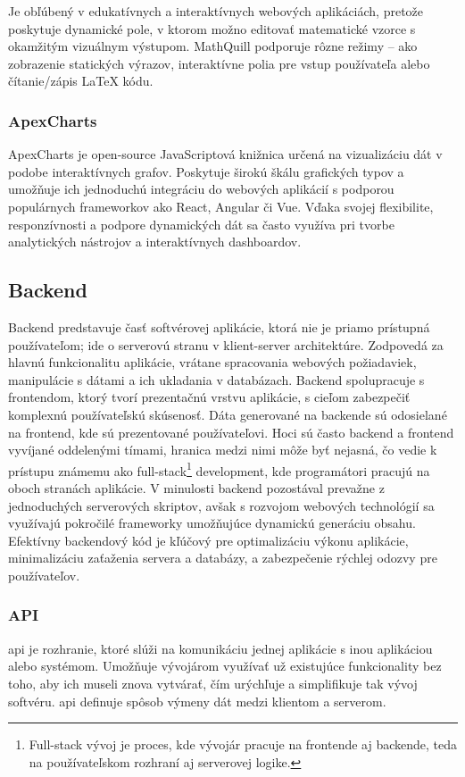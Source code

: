 Je obľúbený v edukatívnych a interaktívnych webových aplikáciách, pretože poskytuje dynamické pole, v ktorom možno editovať matematické vzorce s okamžitým vizuálnym výstupom. 
MathQuill podporuje rôzne režimy – ako zobrazenie statických výrazov, interaktívne polia pre vstup používateľa alebo čítanie/zápis LaTeX kódu.\cite{mathquill}
\subsubsection{ApexCharts}
ApexCharts je open-source JavaScriptová knižnica určená na vizualizáciu dát v podobe interaktívnych grafov.
 Poskytuje širokú škálu grafických typov a umožňuje ich jednoduchú integráciu do webových aplikácií s podporou populárnych frameworkov ako React, Angular či Vue. 
Vďaka svojej flexibilite, responzívnosti a podpore dynamických dát sa často využíva pri tvorbe analytických nástrojov a interaktívnych dashboardov.\cite{apexcharts}

\subsection{Backend}
Backend predstavuje časť softvérovej aplikácie, ktorá nie je priamo prístupná používateľom; ide o serverovú stranu v klient-server architektúre.
 Zodpovedá za hlavnú funkcionalitu aplikácie, vrátane spracovania webových požiadaviek, manipulácie s dátami a ich ukladania v databázach. Backend spolupracuje s frontendom, ktorý tvorí prezentačnú vrstvu aplikácie, s cieľom zabezpečiť komplexnú používateľskú skúsenosť. 
 Dáta generované na backende sú odosielané na frontend, kde sú prezentované používateľovi.
  Hoci sú často backend a frontend vyvíjané oddelenými tímami, hranica medzi nimi môže byť nejasná, čo vedie k prístupu známemu ako full-stack\footnote{Full-stack vývoj je proces, kde vývojár pracuje na frontende aj backende, teda na používateľskom rozhraní aj serverovej logike.} development, kde programátori pracujú na oboch stranách aplikácie.
   V minulosti backend pozostával prevažne z jednoduchých serverových skriptov, avšak s rozvojom webových technológií sa využívajú pokročilé frameworky umožňujúce dynamickú generáciu obsahu.
 Efektívny backendový kód je kľúčový pre optimalizáciu výkonu aplikácie, minimalizáciu zaťaženia servera a databázy, a zabezpečenie rýchlej odozvy pre používateľov. \cite{backend} 
 \subsubsection{API}
 \acrfull{api} je rozhranie, ktoré slúži na komunikáciu jednej aplikácie s inou aplikáciou alebo systémom.
 Umožňuje vývojárom využívať už existujúce funkcionality bez toho, aby ich museli znova vytvárať, čím urýchľuje a simplifikuje tak vývoj softvéru.
  \acrshort{api} definuje spôsob výmeny dát medzi klientom a serverom. \cite{api}

